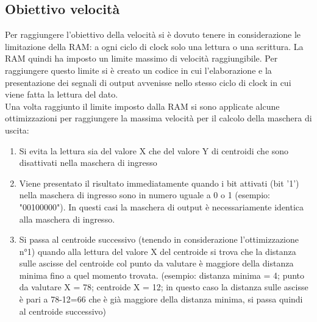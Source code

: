 \documentclass{article}
\begin{document}
\subsection{Obiettivo velocità} \label{subsection-ob-vel}
Per raggiungere l'obiettivo della velocità si è dovuto tenere in considerazione le limitazione della RAM: a ogni ciclo di clock solo una lettura o una scrittura. La RAM quindi ha imposto un limite massimo di velocità raggiungibile. Per raggiungere questo limite si è creato un codice in cui l'elaborazione e la presentazione dei segnali di output avvenisse nello stesso ciclo di clock in cui viene fatta la lettura del dato.\\
Una volta raggiunto il limite imposto dalla RAM si sono applicate alcune ottimizzazioni per raggiungere la massima velocità per il calcolo della maschera di uscita:
\begin{enumerate}
  \item Si evita la lettura sia del valore X che del valore Y di centroidi che sono disattivati nella maschera di ingresso
  \item Viene presentato il risultato immediatamente quando i bit attivati (bit '1') nella maschera di ingresso sono in numero uguale a 0 o 1 (esempio: "00100000"). In questi casi la maschera di output è necessariamente identica alla maschera di ingresso.
  \item Si passa al centroide successivo (tenendo in considerazione l'ottimizzazione n°1) quando alla lettura del valore X del centroide si trova che la distanza sulle ascisse del centroide col punto da valutare è maggiore della distanza minima fino a quel momento trovata. (esempio: distanza minima = 4; punto da valutare X = 78; centroide X = 12; in questo caso la distanza sulle ascisse è pari a 78-12=66 che è già maggiore della distanza minima, si passa quindi al centroide successivo)
\end{enumerate}
\end{document}
